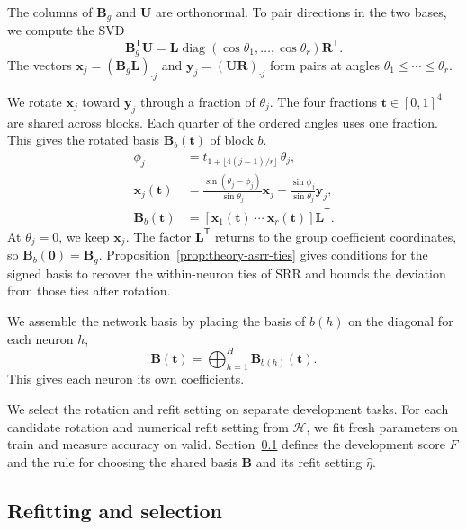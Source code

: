 The columns of $\mathbf B_g$ and $\mathbf U$ are orthonormal. To pair
directions in the two bases, we compute the SVD
\[
    \mathbf B_g^{\mathsf T}\mathbf U
    =\mathbf L\operatorname{diag}(\cos\theta_1,\ldots,\cos\theta_r)
        \mathbf R^{\mathsf T}.
\]
The vectors $\mathbf x_j=(\mathbf B_g\mathbf L)_{\cdot j}$ and
$\mathbf y_j=(\mathbf U\mathbf R)_{\cdot j}$ form pairs at angles
$\theta_1\le\cdots\le\theta_r$.

We rotate $\mathbf x_j$ toward $\mathbf y_j$ through a fraction of
$\theta_j$. The four fractions $\mathbf t\in[0,1]^4$ are shared across
blocks. Each quarter of the ordered angles uses one fraction. This gives
the rotated basis $\mathbf B_b(\mathbf t)$ of block $b$.
\begin{equation}
    \begin{aligned}
        \phi_j&=t_{1+\lfloor 4(j-1)/r\rfloor}\,\theta_j,\\
        \mathbf x_j(\mathbf t)&=
            \frac{\sin(\theta_j-\phi_j)}{\sin\theta_j}\mathbf x_j
            +\frac{\sin\phi_j}{\sin\theta_j}\mathbf y_j,\\
        \mathbf B_b(\mathbf t)&=
            [\mathbf x_1(\mathbf t)\ \cdots\ \mathbf x_r(\mathbf t)]
            \mathbf L^{\mathsf T}.
    \end{aligned}
    \label{eq:asrr-rotation}
\end{equation}
At $\theta_j=0$, we keep $\mathbf x_j$. The factor $\mathbf L^{\mathsf T}$
returns to the group coefficient coordinates, so
$\mathbf B_b(\mathbf 0)=\mathbf B_g$.
Proposition~\ref{prop:theory-asrr-ties} gives conditions for the signed
basis to recover the within-neuron ties of SRR and bounds the deviation
from those ties after rotation.

We assemble the network basis by placing the basis of $b(h)$ on the
diagonal for each neuron $h$,
\[
    \mathbf B(\mathbf t)=\bigoplus_{h=1}^H\mathbf B_{b(h)}(\mathbf t).
\]
This gives each neuron its own coefficients.

We select the rotation and refit setting on separate development tasks.
For each candidate rotation and numerical refit setting from
$\mathcal H$, we fit fresh parameters on train and measure accuracy on
valid. Section~\ref{sec:method-selection} defines the development score
$F$ and the rule for choosing the shared basis $\mathbf B$ and its
refit setting $\widehat\eta$.

\subsection{Refitting and selection}
\label{sec:method-selection}

